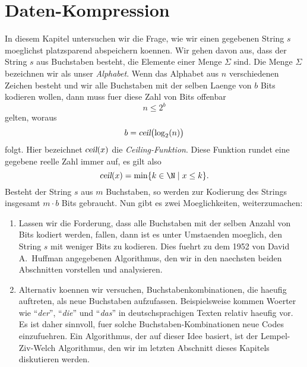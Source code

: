 \chapter{Daten-Kompression}
In diesem Kapitel untersuchen wir die Frage, wie wir einen gegebenen String $s$ moeglichst platzsparend
abspeichern koennen.  Wir gehen davon aus, dass der String $s$ aus Buchstaben besteht, die 
Elemente einer Menge $\Sigma$ sind.  Die Menge $\Sigma$ bezeichnen wir als unser \emph{Alphabet}. 
Wenn das Alphabet aus $n$ verschiedenen Zeichen besteht und wir alle Buchstaben mit der selben Laenge
von $b$ Bits kodieren wollen, dann muss fuer diese Zahl von Bits offenbar
\[ n \leq 2^b \] 
gelten, woraus
\[ b = \textsl{ceil}\bigl(\log_2(n)\bigr) \]
folgt.  Hier bezeichnet $\textsl{ceil}(x)$ die \emph{Ceiling-Funktion}.  Diese Funktion
rundet eine gegebene reelle Zahl immer auf, es gilt also
\[ \textsl{ceil}(x) = \min \{ k \in \N \mid x \leq k \}. \]
Besteht der String $s$ aus $m$ Buchstaben, so werden zur Kodierung des Strings insgesamt
$m \cdot b$ Bits gebraucht.  Nun gibt es zwei Moeglichkeiten, weiterzumachen:
\begin{enumerate}
\item Lassen wir die Forderung, dass alle Buchstaben mit der selben Anzahl von Bits kodiert werden,
      fallen, dann ist es unter Umstaenden moeglich, den String $s$ mit weniger Bits zu kodieren.  
      Dies fuehrt zu dem 1952 von David A.~Huffman angegebenen Algorithmus, den wir in den naechsten
      beiden Abschnitten vorstellen und analysieren.
\item Alternativ koennen wir versuchen, Buchstabenkombinationen, die haeufig auftreten, als neue
      Buchstaben aufzufassen.  Beispielsweise kommen Woerter wie ``\emph{der}'', ``\emph{die}'' und
      ``\emph{das}'' in deutschsprachigen Texten relativ haeufig vor.  Es ist daher sinnvoll, fuer
      solche Buchstaben-Kombinationen neue Codes einzufuehren.  Ein Algorithmus, der auf dieser Idee
      basiert, ist der Lempel-Ziv-Welch Algorithmus, den wir im letzten Abschnitt dieses Kapitels 
      diskutieren werden.
\end{enumerate}


